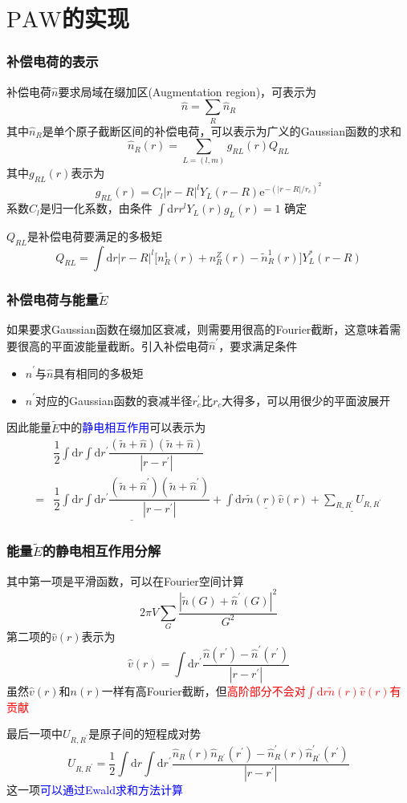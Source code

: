 \documentclass[cjk,slidestop,compress,mathserif,blue]{beamer}
\begin{document}
\section{$\mathrm{PAW}$的实现}
\frame
{
	\frametitle{补偿电荷的表示}
	补偿电荷$\hat n$要求局域在缀加区(\textrm{Augmentation region})，可表示为
	$$\hat n=\sum_R\hat n_R$$
	其中$\hat n_R$是单个原子截断区间的补偿电荷，可以表示为广义的\textrm{Gaussian}函数的求和
	$$\hat n_R(r)=\sum_{L=(l,m)}g_{RL}(r)Q_{RL}$$
	其中$g_{RL}(r)$表示为
	$$g_{RL}(r)=C_l|r-R|^lY_L(r-R)\mathrm{e}^{-(|r-R|/r_c)^2}$$
	系数$C_l$是归一化系数，由条件
	$\int\mathrm{d}rr^lY_L(r)g_L(r)=1$
	确定

	$Q_{RL}$是补偿电荷要满足的多极矩
	$$Q_{RL}=\int\mathrm{d}r|r-R|^l\big[n_R^1(r)+n_R^Z(r)-\tilde n_R^1(r)\big]Y_L^{\ast}(r-R)$$
}

\frame
{
	\frametitle{补偿电荷与能量$\tilde E$}
	如果要求\textrm{Gaussian}函数在缀加区衰减，则需要用很高的\textrm{Fourier}截断，这意味着需要很高的平面波能量截断。引入补偿电荷$\hat n^{\prime}$，要求满足条件
	\begin{itemize}
		\item $\hat n^{\prime}$与$\hat n$具有相同的多极矩
		\item $\hat n^{\prime}$对应的\textrm{Gaussian}函数的衰减半径$r_c^{\prime}$比$r_c$大得多，可以用很少的平面波展开
	\end{itemize}
	因此能量$\tilde E$中的\textcolor{blue}{静电相互作用}可以表示为
	\begin{displaymath}
		\begin{aligned}
			&\dfrac12\int\mathrm{d}r\int\mathrm{d}r^{\prime}\dfrac{(\tilde n+\hat n)(\tilde n+\hat n)}{|r-r^{\prime}|}\\
			=&\underline{\dfrac12\int\mathrm{d}r\int\mathrm{d}r^{\prime}\dfrac{(\tilde n+\hat n^{\prime})(\tilde n+\hat n^{\prime})}{|r-r^{\prime}|}}
			+\underline{\int\mathrm{d}r\tilde n(r)\hat v(r)}+\underline{\sum_{R,R^{\prime}}U_{R,R^{\prime}}}
		\end{aligned}
	\end{displaymath}
}

\frame
{
	\frametitle{能量$\tilde E$的静电相互作用分解}
	其中第一项是平滑函数，可以在\textrm{Fourier}空间计算
	$$2\pi V\sum_G\dfrac{|\tilde n(G)+\hat n^{\prime}(G)|^2}{G^2}$$
	第二项的$\hat v(r)$表示为
	$$\hat v(r)=\int\mathrm{d}r^{\prime}\dfrac{\hat n(r^{\prime})-\hat n^{\prime}(r^{\prime})}{|r-r^{\prime}|}$$
	虽然$\hat v(r)$和$n(r)$一样有高\textrm{Fourier}截断，但\textcolor{red}{高阶部分不会对$\int\mathrm{d}r\tilde n(r)\hat v(r)$有贡献}

	最后一项中$U_{R,R^{\prime}}$是原子间的短程成对势
	$$U_{R,R^{\prime}}=\dfrac12\int\mathrm{d}r\int\mathrm{d}r^{\prime}\dfrac{\hat n_R(r)\hat n_{R^{\prime}}(r^{\prime})-\hat n_R^{\prime}(r)\hat n_{R^{\prime}}^{\prime}(r^{\prime})}{|r-r^{\prime}|}$$
	这一项\textcolor{blue}{可以通过\textrm{Ewald}求和方法计算}
}
\end{document}
